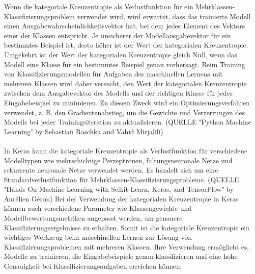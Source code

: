 Wenn die kategoriale Kreuzentropie als Verlustfunktion für ein Mehrklassen-Klassifizierungsproblem verwendet wird, wird erwartet, dass das trainierte Modell einen Ausgabewahrscheinlichkeitsvektor hat, bei dem jedes Element des Vektors einer der Klassen entspricht. 
Je unsicherer der Modellausgabevektor für ein bestimmtes Beispiel ist, desto höher ist der Wert der kategorialen Kreuzentropie. 
Umgekehrt ist der Wert der kategorialen Kreuzentropie gleich Null, wenn das Modell eine Klasse für ein bestimmtes Beispiel genau vorhersagt.
Beim Training von Klassifizierungsmodellen für Aufgaben des maschinellen Lernens mit mehreren Klassen wird daher versucht, den Wert der kategorialen Kreuzentropie zwischen dem Ausgabevektor des Modells und der richtigen Klasse für jedes Eingabebeispiel zu minimieren. 
Zu diesem Zweck wird ein Optimierungsverfahren verwendet, z. B. den Gradientenabstieg, um die Gewichte und Verzerrungen des Modells bei jeder Trainingsiteration zu aktualisieren. (QUELLE "Python Machine Learning" by Sebastian Raschka and Vahid Mirjalili)\\\\
In Keras kann die kategoriale Kreuzentropie als Verlustfunktion für verschiedene Modelltypen wie mehrschichtige Perzeptronen, faltungsneuronale Netze und rekurrente neuronale Netze verwendet werden. 
Es handelt sich um eine Standardverlustfunktion für Mehrklassen-Klassifizierungsprobleme. (QUELLE "Hands-On Machine Learning with Scikit-Learn, Keras, and TensorFlow" by Aurélien Géron)
Bei der Verwendung der kategorialen Kreuzentropie in Keras können auch verschiedene Parameter wie Klassengewichte und Modellbewertungsmetriken angepasst werden, um genauere Klassifizierungsergebnisse zu erhalten. 
Somit ist die kategoriale Kreuzentropie ein wichtiges Werkzeug beim maschinellen Lernen zur Lösung von Klassifizierungsproblemen mit mehreren Klassen. 
Ihre Verwendung ermöglicht es, Modelle zu trainieren, die Eingabebeispiele genau klassifizieren und eine hohe Genauigkeit bei Klassifizierungsaufgaben erreichen können.

\endinput